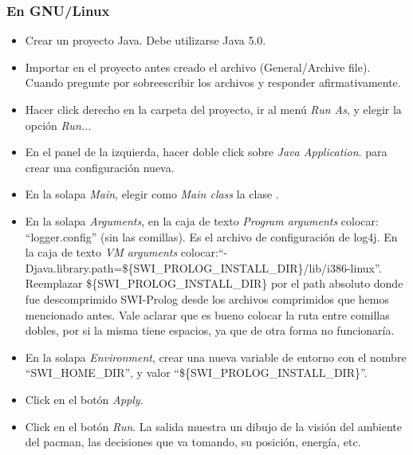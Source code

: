 \subsubsection{En GNU/Linux}
\begin{itemize}

\item Crear un proyecto Java. Debe utilizarse Java 5.0.

\item Importar en el proyecto antes creado el archivo 
(General/Archive file).  Cuando pregunte por sobreescribir los archivos
 y  responder afirmativamente.

\item Hacer click derecho en la carpeta del proyecto, ir al menú \emph{Run As},
y elegir la opción \emph{Run...}

\item En el panel de la izquierda, hacer doble click sobre \emph{Java Application}.
para crear una configuración nueva.

\item En la solapa \emph{Main}, elegir como \emph{Main class} la clase .

\item En la solapa \emph{Arguments}, en la caja de texto \emph{Program arguments} colocar:
``logger.config'' (sin las comillas). Es el archivo de configuración de log4j. En la caja de texto \emph{VM arguments}
colocar:\newline``-Djava.library.path=\$\{SWI\_PROLOG\_INSTALL\_DIR\}/lib/i386-linux''.\newline
Reemplazar \$\{SWI\_PROLOG\_INSTALL\_DIR\} por el path absoluto donde fue descomprimido SWI-Prolog desde los
archivos comprimidos que hemos mencionado antes. Vale aclarar que es bueno colocar la ruta entre comillas
dobles, por si la misma tiene espacios, ya que de otra forma no funcionaría.

\item En la solapa \emph{Environment}, crear una nueva variable de entorno con el nombre ``SWI\_HOME\_DIR'',
y valor ``\$\{SWI\_PROLOG\_INSTALL\_DIR\}''.

\item Click en el botón \emph{Apply}.

\item Click en el botón \emph{Run}. La salida muestra un dibujo de la visión del ambiente del pacman,
las decisiones que va tomando, su posición, energía, etc.

\end{itemize}


